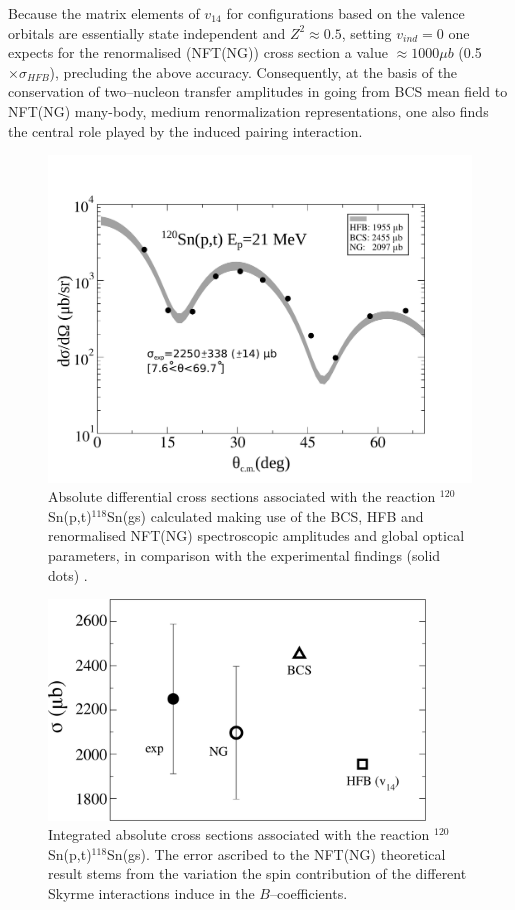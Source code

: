 Because the matrix elements of $v_{14}$ for configurations based  on the valence orbitals are essentially state independent and
$Z^2 \approx 0.5$, setting $v_{ind} = 0$ one expects for the renormalised (NFT(NG)) cross section a value 
$\approx 1000 \mu b$ (0.5 $\times \sigma_{HFB}$), precluding the above accuracy. Consequently, at the basis 
of the  conservation of two--nucleon transfer  amplitudes in going 
from BCS mean field to NFT(NG) many-body, medium renormalization representations, one also finds the central role  played by the induced pairing
interaction.
  \begin{figure}
  \centerline{\includegraphics*[width=12cm,angle=0]{C8/figsC8/Fig2_v2}}
  	\caption{Absolute differential  cross sections associated with the reaction
  	$^{120}$Sn(p,t)$^{118}$Sn(gs) calculated making use of the BCS, HFB and renormalised NFT(NG) spectroscopic 
  	amplitudes and global optical parameters, in comparison with the experimental findings (solid dots) \cite{Guazzoni:08}.}\label{fig6.4.2}
  \end{figure}
  \begin{figure}
  \centerline{\includegraphics*[width=10cm,angle=0]{C8/figsC8/fig5_v2}}
  	\caption{Integrated absolute  cross sections associated with the reaction
  	$^{120}$Sn(p,t)$^{118}$Sn(gs). The error ascribed  to
  	the NFT(NG) theoretical result stems from the variation the spin contribution of the different Skyrme interactions induce in the $B$--coefficients.}\label{fig6.4.3}
  \end{figure}
  
